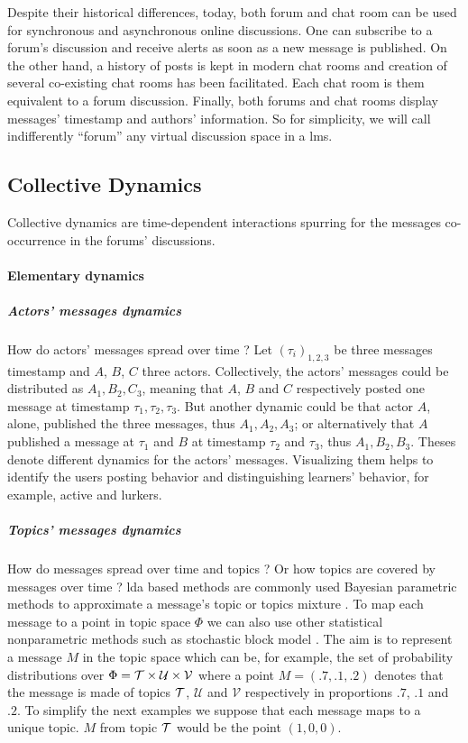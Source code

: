 \documentclass[a4paper,twoside]{article}
\newcommand{\V}{\mathcal{V}}
\newcommand{\U}{\mathcal{U}}
\begin{document}
Despite their historical differences, today, both forum and chat room can be used for synchronous and asynchronous online discussions.  One can subscribe to a forum's discussion and receive alerts as soon as a new message is published.  On the other hand, a history of posts is kept in modern chat rooms and creation of several co-existing chat rooms has been facilitated.  Each chat room is them equivalent to a forum discussion.  Finally, both forums and chat rooms display messages' timestamp and authors' information.
So for simplicity, we will call indifferently ``forum'' any virtual discussion space in a \gls{lms}.

\subsection{Collective Dynamics}

Collective dynamics are time-dependent interactions spurring for the messages co-occurrence in the forums' discussions.

\paragraph{Elementary dynamics}

\subparagraph{Actors' messages dynamics}
How do actors' messages spread over time ? Let $(\tau_i)_{1, 2, 3}$ be three messages timestamp and $A$, $B$, $C$ three actors.  Collectively, the actors' messages could be distributed as $A_1, B_2,C_3$, meaning that $A$, $B$ and $C$ respectively posted one message at timestamp $\tau_1, \tau_2, \tau_3$.  But another dynamic could be that actor $A$, alone, published the three messages, thus $A_1, A_2, A_3$; or alternatively that $A$ published a message at $\tau_1$ and $B$ at timestamp $\tau_2$ and $\tau_3$, thus $A_1, B_2, B_3$.  Theses denote different dynamics for the actors' messages.  Visualizing them helps to identify the users posting behavior and distinguishing learners' behavior, for example, active and lurkers.


\subparagraph{Topics' messages dynamics}
How do messages spread over time and topics ? Or how topics are covered by messages over time ?
\gls{lda} based methods are commonly used Bayesian parametric methods to approximate a message's topic or topics mixture \citep{Jelodar2017}.  To map each message to a point in topic space $\Phi$ we can also use other statistical nonparametric methods such as stochastic block model \citep{Gerlach2018}.   The aim is to represent a message $M$ in the topic space which can be, for example, the set of probability distributions over $\Phi = \T\times \U \times \V$ where a point $M = (.7, .1, .2)$ denotes that the message is made of topics $\mathcal{T}$, $\U$ and $\V$ respectively in proportions $.7$, $.1$ and $.2$.  To simplify the next examples we suppose that each message maps to a unique topic.  $M$ from topic $\mathcal{T}$ would be the point $(1, 0, 0)$.
\end{document}
